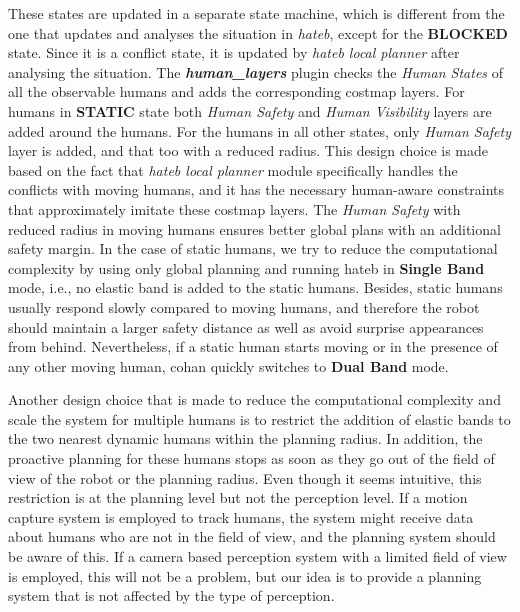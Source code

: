 These states are updated in a separate state machine, which is different from the one that updates and analyses the situation in \textit{\acrshort{hateb}}, except for the \textbf{BLOCKED} state. Since it is a conflict state, it is updated by \textit{\acrshort{hateb} local planner} after analysing the situation. The \textbf{\textit{human\_layers}} plugin checks the \textit{Human States} of all the observable humans and adds the corresponding costmap layers. For humans in \textbf{STATIC} state both \textit{Human Safety} and \textit{Human Visibility} layers are added around the humans. For the humans in all other states, only \textit{Human Safety} layer is added, and that too with a reduced radius. This design choice is made based on the fact that \textit{\acrshort{hateb} local planner} module specifically handles the conflicts with moving humans, and it has the necessary human-aware constraints that approximately imitate these costmap layers. The \textit{Human Safety} with reduced radius in moving humans ensures better global plans with an additional safety margin. In the case of static humans, we try to reduce the computational complexity by using only global planning and running \acrshort{hateb} in \textbf{Single Band} mode, i.e., no elastic band is added to the static humans. Besides, static humans usually respond slowly compared to moving humans, and therefore the robot should maintain a larger safety distance as well as avoid surprise appearances from behind. Nevertheless, if a static human starts moving or in the presence of any other moving human, \acrshort{cohan} quickly switches to \textbf{Dual Band} mode. 

Another design choice that is made to reduce the computational complexity and scale the system for multiple humans is to restrict the addition of elastic bands to the two nearest dynamic humans within the planning radius. In addition, the proactive planning for these humans stops as soon as they go out of the field of view of the robot or the planning radius. Even though it seems intuitive, this restriction is at the planning level but not the perception level. If a motion capture system is employed to track humans, the system might receive data about humans who are not in the field of view, and the planning system should be aware of this. If a camera based perception system with a limited field of view is employed, this will not be a problem, but our idea is to provide a planning system that is not affected by the type of perception.  


